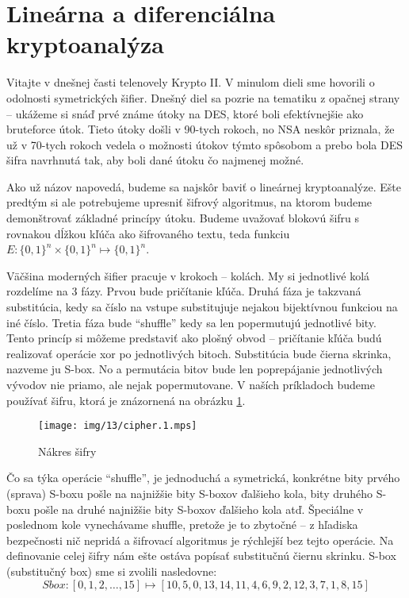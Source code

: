 \section{Lineárna a diferenciálna kryptoanalýza}

Vitajte v dnešnej časti telenovely Krypto II. V minulom dieli sme
hovorili o odolnosti symetrických šifier. Dnešný diel sa pozrie na
tematiku z opačnej strany -- ukážeme si snáď prvé známe útoky na DES,
ktoré boli efektívnejšie ako bruteforce útok. Tieto útoky došli v
90-tych rokoch, no NSA neskôr priznala, že už v 70-tych rokoch vedela
o možnosti útokov týmto spôsobom a prebo bola DES šifra navrhnutá tak,
aby boli dané útoku čo najmenej možné.

Ako už názov napovedá, budeme sa najskôr baviť o lineárnej
kryptoanalýze. Ešte predtým si ale potrebujeme upresniť šifrový
algoritmus, na ktorom budeme demonštrovať základné princípy útoku.
Budeme uvažovať blokovú šifru s rovnakou dĺžkou kľúča ako šifrovaného
textu, teda funkciu $E:\{0,1\}^n \times \{0,1\}^n \mapsto \{0,1\}^n$.

Väčšina moderných šifier pracuje v krokoch -- kolách.
My si jednotlivé kolá rozdelíme na 3 fázy. Prvou bude pričítanie
kľúča.
Druhá fáza je takzvaná substitúcia, kedy sa číslo na vstupe substitujuje
nejakou bijektívnou funkciou na iné číslo.
Tretia fáza bude ``shuffle'' kedy sa len popermutujú jednotlivé bity.
Tento princíp si môžeme predstaviť ako plošný obvod -- pričítanie
kľúča budú realizovať operácie xor po jednotlivých bitoch.
Substitúcia bude čierna skrinka, nazveme ju S-box. No a permutácia
bitov bude len poprepájanie jednotlivých vývodov nie priamo, ale nejak
popermutovane. V naších príkladoch budeme používať šifru, ktorá je
znázornená na obrázku \ref{fig:cipher}.

\begin{figure}[h]
    \centering
    \texttt{[image: img/13/cipher.1.mps]}
    \label{fig:cipher}
    \caption{Nákres šifry}
\end{figure}

Čo sa týka operácie ``shuffle'', je jednoduchá a symetrická, konkrétne
bity prvého (sprava) S-boxu pošle na najnižšie bity S-boxov ďalšieho kola,
bity druhého S-boxu pošle na druhé najnižšie bity S-boxov ďalšieho
kola atď. Špeciálne v poslednom kole vynechávame shuffle, pretože je
to zbytočné -- z hľadiska bezpečnosti nič nepridá a šifrovací
algoritmus je rýchlejší bez tejto operácie. Na definovanie celej šifry
nám ešte ostáva popísať substitučnú čiernu skrinku.
S-box (substitučný box) sme si zvolili nasledovne:
\begin{equation*}
    Sbox:[0,1,2,\dots,15] \mapsto
    [10, 5, 0, 13, 14, 11, 4, 6, 9, 2, 12, 3, 7, 1, 8, 15]
\end{equation*}

